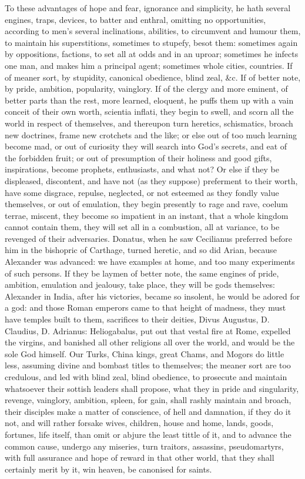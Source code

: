 {To these advantages of hope and fear, ignorance and simplicity, he hath
several engines, traps, devices, to batter and enthral, omitting no
opportunities, according to men's several inclinations, abilities, to
circumvent and humour them, to maintain his superstitions, sometimes to
stupefy, besot them: sometimes again by oppositions, factions, to set
all at odds and in an uproar; sometimes he infects one man, and makes
him a principal agent; sometimes whole cities, countries. If of meaner
sort, by stupidity, canonical obedience, blind zeal, \&c. If of better
note, by pride, ambition, popularity, vainglory. If of the clergy and
more eminent, of better parts than the rest, more learned, eloquent, he
puffs them up with a vain conceit of their own worth, scientia inflati,
they begin to swell, and scorn all the world in respect of themselves,
and thereupon turn heretics, schismatics, broach new doctrines, frame
new crotchets and the like; or else out of too much learning become
mad, or out of curiosity they will search into God's secrets, and eat
of the forbidden fruit; or out of presumption of their holiness and
good gifts, inspirations, become prophets, enthusiasts, and what not?
Or else if they be displeased, discontent, and have not (as they
suppose) preferment to their worth, have some disgrace, repulse,
neglected, or not esteemed as they fondly value themselves, or out of
emulation, they begin presently to rage and rave, coelum terrae,
miscent, they become so impatient in an instant, that a whole kingdom
cannot contain them, they will set all in a combustion, all at
variance, to be revenged of their adversaries. Donatus, when he
saw Cecilianus preferred before him in the bishopric of Carthage,
turned heretic, and so did Arian, because Alexander was advanced: we
have examples at home, and too many experiments of such persons. If
they be laymen of better note, the same engines of pride, ambition,
emulation and jealousy, take place, they will be gods themselves:
Alexander in India, after his victories, became so insolent, he
would be adored for a god: and those Roman emperors came to that height
of madness, they must have temples built to them, sacrifices to their
deities, Divus Augustus, D. Claudius, D. Adrianus: Heliogabalus,
put out that vestal fire at Rome, expelled the virgins, and banished
all other religions all over the world, and would be the sole God
himself. Our Turks, China kings, great Chams, and Mogors do little
less, assuming divine and bombast titles to themselves; the meaner sort
are too credulous, and led with blind zeal, blind obedience, to
prosecute and maintain whatsoever their sottish leaders shall propose,
what they in pride and singularity, revenge, vainglory, ambition,
spleen, for gain, shall rashly maintain and broach, their disciples
make a matter of conscience, of hell and damnation, if they do it not,
and will rather forsake wives, children, house and home, lands, goods,
fortunes, life itself, than omit or abjure the least tittle of it, and
to advance the common cause, undergo any miseries, turn traitors,
assassins, pseudomartyrs, with full assurance and hope of reward in
that other world, that they shall certainly merit by it, win heaven, be
canonised for saints.

}
